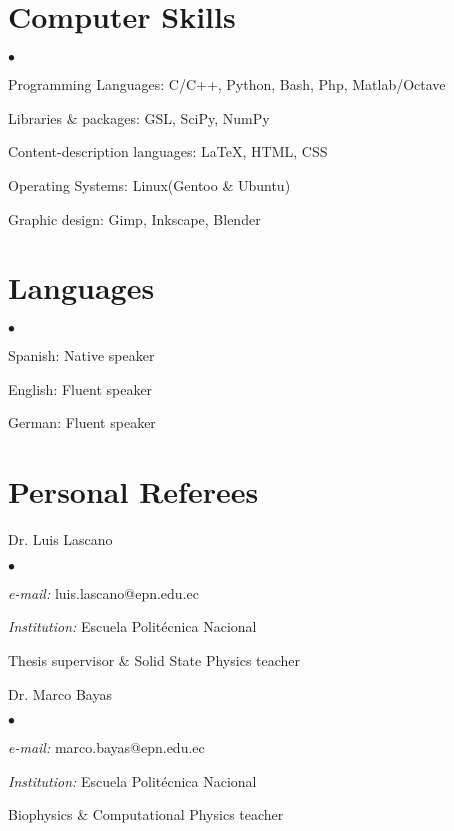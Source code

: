 \documentclass[margin,line]{res}
\newenvironment{list1}{
  \begin{list}{\ding{113}}{%
      \setlength{\itemsep}{0in}
      \setlength{\parsep}{0in} \setlength{\parskip}{0in}
      \setlength{\topsep}{0in} \setlength{\partopsep}{0in} 
      \setlength{\leftmargin}{0.17in}}}{\end{list}}
\newenvironment{list2}{
  \begin{list}{$\bullet$}{%
      \setlength{\itemsep}{0in}
      \setlength{\parsep}{0in} \setlength{\parskip}{0in}
      \setlength{\topsep}{0in} \setlength{\partopsep}{0in} 
      \setlength{\leftmargin}{0.2in}}}{\end{list}}
\begin{document}
\begin{resume}
\section{\sc Computer Skills}
  \begin{list2}
    \item Programming Languages:  C/C++, Python, Bash, Php, Matlab/Octave
    \item Libraries \& packages: GSL, SciPy, NumPy
    \item Content-description languages: \LaTeX, HTML, CSS
    \item Operating Systems:  Linux(Gentoo \& Ubuntu)
    \item Graphic design: Gimp, Inkscape, Blender
  \end{list2}

\section{\sc Languages}
  \begin{list2}
    \item Spanish: Native speaker
    \item English: Fluent speaker
    \item German: Fluent speaker
  \end{list2}
  
\section{\sc Personal Referees}
 \begin{list1}
  \item[] Dr. Luis Lascano
  \begin{list2}
   \item {\it e-mail:} luis.lascano@epn.edu.ec
   \item {\it Institution:} Escuela Politécnica Nacional
   \item Thesis supervisor \& Solid State Physics teacher
  \end{list2}
 \end{list1}
 
  \begin{list1}
  \item[] Dr. Marco Bayas
  \begin{list2}
   \item {\it e-mail:} marco.bayas@epn.edu.ec
   \item {\it Institution:} Escuela Politécnica Nacional
   \item Biophysics \& Computational Physics teacher
  \end{list2}
 \end{list1}


\end{resume}
\end{document}
